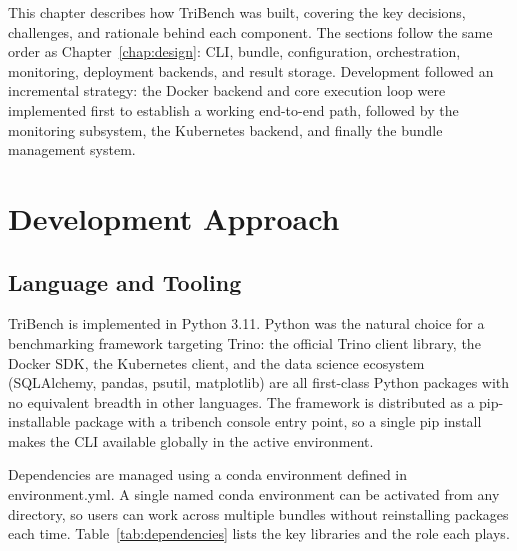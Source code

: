 \documentclass{l4proj}
\begin{document}
This chapter describes how TriBench was built, covering the key decisions, challenges, and rationale behind each component. The sections follow the same order as Chapter~\ref{chap:design}: CLI, bundle, configuration, orchestration, monitoring, deployment backends, and result storage. Development followed an incremental strategy: the Docker backend and core execution loop were implemented first to establish a working end-to-end path, followed by the monitoring subsystem, the Kubernetes backend, and finally the bundle management system.

\section{Development Approach}
\label{sec:impl_approach}

\subsection{Language and Tooling}
\label{sec:impl_language}

TriBench is implemented in Python 3.11. Python was the natural choice for a benchmarking framework targeting Trino: the official Trino client library, the Docker SDK, the Kubernetes client, and the data science ecosystem (SQLAlchemy, pandas, psutil, matplotlib) are all first-class Python packages with no equivalent breadth in other languages. The framework is distributed as a pip-installable package with a tribench console entry point, so a single pip install makes the CLI available globally in the active environment.

Dependencies are managed using a conda environment defined in environment.yml. A single named conda environment can be activated from any directory, so users can work across multiple bundles without reinstalling packages each time. Table~\ref{tab:dependencies} lists the key libraries and the role each plays.
\end{document}
